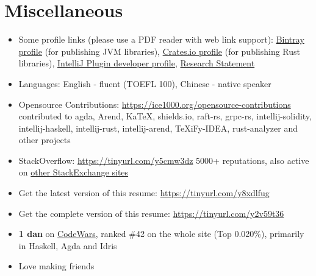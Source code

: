 \documentclass{resume}
\begin{document}
\section{Miscellaneous}
\begin{itemize}[parsep=0.25ex]
\item Some profile links (please use a PDF reader with web link support):
\href{https://bintray.com/ice1000}{Bintray profile} (for publishing JVM libraries),
\href{https://crates.io/users/ice1000}{Crates.io profile} (for publishing Rust libraries),
\href{https://plugins.jetbrains.com/author/10a216dd-c558-4aaf-aa8a-723f431452fb} {IntelliJ Plugin developer profile},
\href{https://personal.psu.edu/yqz5714}{Research Statement}
\item Languages: English - fluent (TOEFL 100), Chinese - native speaker
\item Opensource Contributions: \url{https://ice1000.org/opensource-contributions}
contributed to \textsf{agda, Arend, KaTeX, shields.io, raft-rs, grpc-rs, intellij-solidity, intellij-haskell, intellij-rust, intellij-arend, TeXiFy-IDEA, rust-analyzer} and other projects
\item StackOverflow: \url{https://tinyurl.com/y5cmw3dz}
5000+ reputations, also active on \href{https://stackexchange.com/users/9532102}{other StackExchange sites}
\item Get the latest version of this resume: \url{https://tinyurl.com/y8xdlfug}
\item Get the complete version of this resume: \url{https://tinyurl.com/y2v59t36}
\item \textbf{1 dan} on \href{https://www.codewars.com/users/ice1000}{CodeWars},
ranked \#42 on the whole site (Top 0.020\%),
primarily in Haskell, Agda and Idris
\item Love making friends
\end{itemize}
\end{document}
